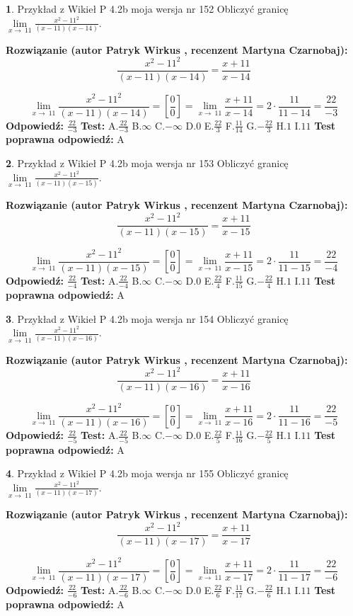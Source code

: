 \documentclass[12pt, a4paper]{article}
\theoremstyle{definition} %
\newtheorem{zad}{}
\newcommand{\zadStart}[1]{\begin{zad}#1\newline}
\newcommand{\zadStop}{\end{zad}}
\newcommand{\rozwStart}[2]{\noindent \textbf{Rozwiązanie (autor #1 , recenzent #2): }\newline}
\newcommand{\rozwStop}{\newline}
\newcommand{\odpStart}{\noindent \textbf{Odpowiedź:}\newline}
\newcommand{\odpStop}{\newline}
\newcommand{\testStart}{\noindent \textbf{Test:}\newline}
\newcommand{\testStop}{\newline}
\newcommand{\kluczStart}{\noindent \textbf{Test poprawna odpowiedź:}\newline}
\newcommand{\kluczStop}{\newline}
\begin{document}
\zadStart{Przykład z Wikieł P 4.2b moja wersja nr 152}
Obliczyć granicę $\lim\limits_{x\to\ 11}\frac{x^{2}-11^{2}}{(x-11)(x-14)}$.
\zadStop
\rozwStart{Patryk Wirkus}{Martyna Czarnobaj}
$$\frac{x^{2}-11^{2}}{(x-11)(x-14)}=\frac{x+11}{x-14}$$

$$\lim\limits_{x\to\ 11}\frac{x^{2}-11^{2}}{(x-11)(x-14)}=[\frac{0}{0}]=\lim\limits_{x\to\ 11}\frac{x+11}{x-14}=2 \cdot \frac{11}{11-14} = \frac{22}{-3}$$
\rozwStop
\odpStart
$\frac{22}{-3}$
\odpStop
\testStart
A.$\frac{22}{-3}$
B.$\infty$
C.$-\infty$
D.$0$
E.$\frac{22}{3}$
F.$\frac{11}{14}$
G.$-\frac{22}{3}$
H.$1$
I.$11$
\testStop
\kluczStart
A
\kluczStop



\zadStart{Przykład z Wikieł P 4.2b moja wersja nr 153}
Obliczyć granicę $\lim\limits_{x\to\ 11}\frac{x^{2}-11^{2}}{(x-11)(x-15)}$.
\zadStop
\rozwStart{Patryk Wirkus}{Martyna Czarnobaj}
$$\frac{x^{2}-11^{2}}{(x-11)(x-15)}=\frac{x+11}{x-15}$$

$$\lim\limits_{x\to\ 11}\frac{x^{2}-11^{2}}{(x-11)(x-15)}=[\frac{0}{0}]=\lim\limits_{x\to\ 11}\frac{x+11}{x-15}=2 \cdot \frac{11}{11-15} = \frac{22}{-4}$$
\rozwStop
\odpStart
$\frac{22}{-4}$
\odpStop
\testStart
A.$\frac{22}{-4}$
B.$\infty$
C.$-\infty$
D.$0$
E.$\frac{22}{4}$
F.$\frac{11}{15}$
G.$-\frac{22}{4}$
H.$1$
I.$11$
\testStop
\kluczStart
A
\kluczStop



\zadStart{Przykład z Wikieł P 4.2b moja wersja nr 154}
Obliczyć granicę $\lim\limits_{x\to\ 11}\frac{x^{2}-11^{2}}{(x-11)(x-16)}$.
\zadStop
\rozwStart{Patryk Wirkus}{Martyna Czarnobaj}
$$\frac{x^{2}-11^{2}}{(x-11)(x-16)}=\frac{x+11}{x-16}$$

$$\lim\limits_{x\to\ 11}\frac{x^{2}-11^{2}}{(x-11)(x-16)}=[\frac{0}{0}]=\lim\limits_{x\to\ 11}\frac{x+11}{x-16}=2 \cdot \frac{11}{11-16} = \frac{22}{-5}$$
\rozwStop
\odpStart
$\frac{22}{-5}$
\odpStop
\testStart
A.$\frac{22}{-5}$
B.$\infty$
C.$-\infty$
D.$0$
E.$\frac{22}{5}$
F.$\frac{11}{16}$
G.$-\frac{22}{5}$
H.$1$
I.$11$
\testStop
\kluczStart
A
\kluczStop



\zadStart{Przykład z Wikieł P 4.2b moja wersja nr 155}
Obliczyć granicę $\lim\limits_{x\to\ 11}\frac{x^{2}-11^{2}}{(x-11)(x-17)}$.
\zadStop
\rozwStart{Patryk Wirkus}{Martyna Czarnobaj}
$$\frac{x^{2}-11^{2}}{(x-11)(x-17)}=\frac{x+11}{x-17}$$

$$\lim\limits_{x\to\ 11}\frac{x^{2}-11^{2}}{(x-11)(x-17)}=[\frac{0}{0}]=\lim\limits_{x\to\ 11}\frac{x+11}{x-17}=2 \cdot \frac{11}{11-17} = \frac{22}{-6}$$
\rozwStop
\odpStart
$\frac{22}{-6}$
\odpStop
\testStart
A.$\frac{22}{-6}$
B.$\infty$
C.$-\infty$
D.$0$
E.$\frac{22}{6}$
F.$\frac{11}{17}$
G.$-\frac{22}{6}$
H.$1$
I.$11$
\testStop
\kluczStart
A
\kluczStop
\end{document}
